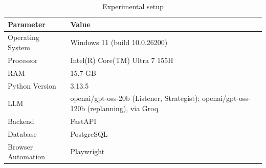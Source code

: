 \begin{table}[htbp]
\caption{Experimental setup}
\label{tab:tableV_setup}
\centering
\begin{tabular}{ll}
\hline
\textbf{Parameter} & \textbf{Value} \\
\hline
Operating System & Windows 11 (build 10.0.26200) \\
Processor & Intel(R) Core(TM) Ultra 7 155H \\
RAM & 15.7 GB \\
Python Version & 3.13.5 \\
LLM & openai/gpt-oss-20b (Listener, Strategist); openai/gpt-oss-120b (replanning), via Groq \\
Backend & FastAPI \\
Database & PostgreSQL \\
Browser Automation & Playwright \\
\hline
\end{tabular}
\end{table}


